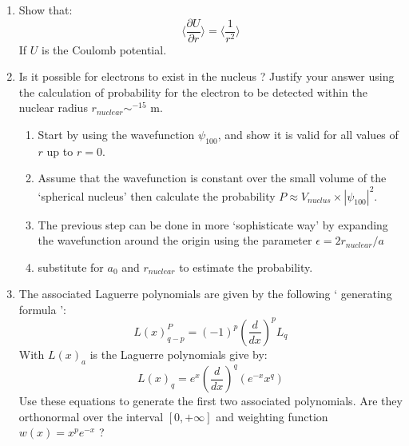\begin{enumerate}
	\item Show that:
	\[ \langle \frac{\partial U}{\partial r}\rangle = \langle \frac{1}{r^2}\rangle\]
	If $U$ is the Coulomb potential.
	\item Is it possible for electrons to exist in the nucleus ?
	Justify your answer using the calculation of probability for the electron to be detected within the nuclear radius $ r_{nuclear} \sim^{-15}$ m.
	\begin{enumerate}
		\item Start by using the wavefunction $ \psi_{100}$, and show it is valid for all values of$r$ up to $r=0$.
		\item Assume that the wavefunction is constant over the small volume of the `spherical nucleus' then calculate the probability $ P \approx V_{nuclus} \times | \psi_{100}|^2$.
		\item The previous step can be done in more `sophisticate way' by expanding the wavefunction around the origin using the parameter $ \epsilon = 2r_{nuclear}/a$
		\item substitute for $a_0$ and $r_{nuclear}$ to estimate the probability.
	\end{enumerate}
	\item The associated Laguerre polynomials are given by the following  ` generating formula ':
	\[ L(x) ^P_ {q-p} = (-1)^p \left( \frac{d}{dx}\right) ^p L_{q}\]
	With $L(x)_a$ is the Laguerre polynomials give by:
	\[ L(x)_q = e^{x}\left( \frac{d}{dx}\right)^q (e^{-x}x^q)\]
	Use these equations to generate the first two associated polynomials.
	Are they orthonormal over the interval $ [ 0, + \infty]$ and weighting function $ w(x) = x^p e^{-x}$ ?
\end{enumerate}